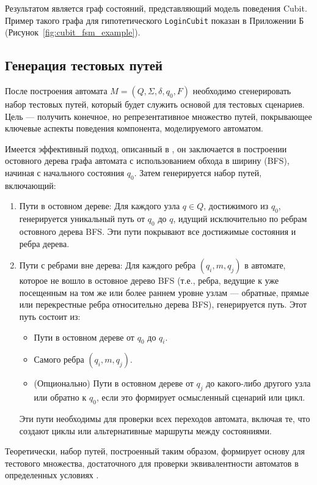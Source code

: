 \documentclass[14pt, russian]{scrartcl}
\begin{document}
Результатом является граф состояний, представляющий модель поведения Cubit. Пример такого графа для гипотетического \texttt{LoginCubit} показан в Приложении Б (Рисунок~\ref{fig:cubit_fsm_example}).

\subsection{Генерация тестовых путей}

После построения автомата $M = (Q, \Sigma, \delta, q_0, F)$ необходимо сгенерировать набор тестовых путей, который будет служить основой для тестовых сценариев. Цель — получить конечное, но репрезентативное множество путей, покрывающее ключевые аспекты поведения компонента, моделируемого автоматом.

Имеется эффективный подход, описанный в \cite{Karhumaki1992}, он заключается в построении остовного дерева графа автомата с использованием обхода в ширину (BFS), начиная с начального состояния $q_0$. Затем генерируется набор путей, включающий:

\begin{enumerate}
    \item {Пути в остовном дереве:} Для каждого узла $q \in Q$, достижимого из $q_0$, генерируется уникальный путь от $q_0$ до $q$, идущий исключительно по ребрам остовного дерева BFS. Эти пути покрывают все достижимые состояния и ребра дерева.
    \item {Пути с ребрами вне дерева:} Для каждого ребра $(q_i, m, q_j)$ в автомате, которое не вошло в остовное дерево BFS (т.е., ребра, ведущие к уже посещенным на том же или более раннем уровне узлам — обратные, прямые или перекрестные ребра относительно дерева BFS), генерируется путь. Этот путь состоит из:
        \begin{itemize}
            \item Пути в остовном дереве от $q_0$ до $q_i$.
            \item Самого ребра $(q_i, m, q_j)$.
            \item (Опционально) Пути в остовном дереве от $q_j$ до какого-либо другого узла или обратно к $q_0$, если это формирует осмысленный сценарий или цикл.
        \end{itemize}
        Эти пути необходимы для проверки всех переходов автомата, включая те, что создают циклы или альтернативные маршруты между состояниями.
\end{enumerate}

Теоретически, набор путей, построенный таким образом, формирует основу для тестового множества, достаточного для проверки эквивалентности автоматов в определенных условиях \cite{Karhumaki1992}.
\end{document}
